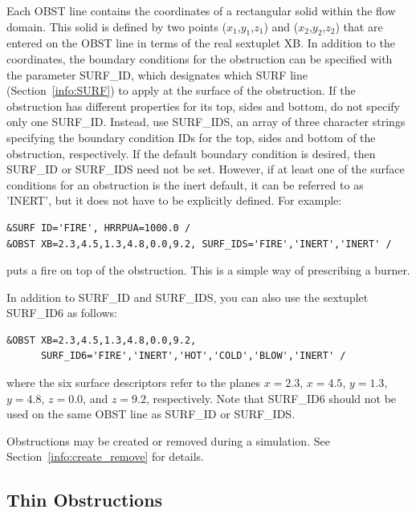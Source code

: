 \documentclass[11pt]{book}
\begin{document}
Each {\ct OBST} line contains the coordinates of a rectangular
solid within the flow domain. This solid is defined by two points
($x_1$,$y_1$,$z_1$) and ($x_2$,$y_2$,$z_2$) that are entered on the
{\ct OBST} line in terms of the real sextuplet {\ct XB}.
In addition to the coordinates, the boundary conditions for the obstruction
can be specified with the parameter {\ct SURF\_ID}, which designates which
{\ct SURF} line (Section~\ref{info:SURF}) to apply at the surface of the obstruction.
If the obstruction has different properties for its top,
sides and bottom, do not specify only one {\ct SURF\_ID}. Instead, use {\ct SURF\_IDS}, an array of three character
strings specifying the boundary condition {\ct ID}s for the top,
sides and bottom of the obstruction, respectively.
If the default
boundary condition is desired, then {\ct SURF\_ID} or {\ct SURF\_IDS} need not be set.
However, if at least one of the surface conditions for an
obstruction is the inert default, it can be referred to as {\ct 'INERT'}, but it does not have to be explicitly defined.
For example:
\begin{lstlisting}
&SURF ID='FIRE', HRRPUA=1000.0 /
&OBST XB=2.3,4.5,1.3,4.8,0.0,9.2, SURF_IDS='FIRE','INERT','INERT' /
\end{lstlisting}
puts a fire on top of the obstruction. This is a simple way of
prescribing a burner.

In addition to {\ct SURF\_ID} and {\ct SURF\_IDS}, you can also use the sextuplet {\ct SURF\_ID6} as follows:
\begin{lstlisting}
&OBST XB=2.3,4.5,1.3,4.8,0.0,9.2,
      SURF_ID6='FIRE','INERT','HOT','COLD','BLOW','INERT' /
\end{lstlisting}
where the six surface descriptors refer to the planes $x=2.3$, $x=4.5$, $y=1.3$, $y=4.8$, $z=0.0$, and $z=9.2$, respectively. Note that {\ct SURF\_ID6} should not be used on the same {\ct OBST} line as {\ct SURF\_ID} or {\ct SURF\_IDS}.

Obstructions may be created or removed during a simulation. See Section~\ref{info:create_remove} for details.


\subsection{Thin Obstructions}
\end{document}
